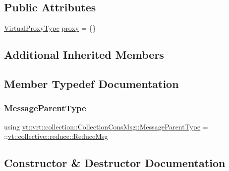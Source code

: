 \subsection*{Public Attributes}
\begin{DoxyCompactItemize}
\item 
\hyperlink{namespacevt_a1b417dd5d684f045bb58a0ede70045ac}{Virtual\+Proxy\+Type} \hyperlink{structvt_1_1vrt_1_1collection_1_1_collection_cons_msg_aa059f3f1cab01c7858b13752eae287d5}{proxy} = \{\}
\end{DoxyCompactItemize}
\subsection*{Additional Inherited Members}


\subsection{Member Typedef Documentation}
\mbox{\label{structvt_1_1vrt_1_1collection_1_1_collection_cons_msg_a9738703ff8037982bd329a650c38a9a1}} 
\subsubsection{\texorpdfstring{Message\+Parent\+Type}{MessageParentType}}
{\footnotesize\ttfamily using \hyperlink{structvt_1_1vrt_1_1collection_1_1_collection_cons_msg_a9738703ff8037982bd329a650c38a9a1}{vt\+::vrt\+::collection\+::\+Collection\+Cons\+Msg\+::\+Message\+Parent\+Type} =  \+::\hyperlink{structvt_1_1collective_1_1reduce_1_1_reduce_msg}{vt\+::collective\+::reduce\+::\+Reduce\+Msg}}



\subsection{Constructor \& Destructor Documentation}
\mbox{\label{structvt_1_1vrt_1_1collection_1_1_collection_cons_msg_af0c627a9c74cb19c0aa142fa650ed4eb}} 
